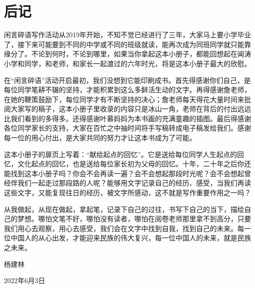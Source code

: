 \chapter{后记}

闲言碎语写作活动从2019年开始，不知不觉已经进行了三年，大家马上要小学毕业了，接下来可能要到不同的中学或不同的班级就读，能再次成为同班同学就只能靠缘分了。不论到何时，不论到哪里，如果当你拿起这本小册子，都能回想起在闻涛小学和同学，和老师，和家长一起渡过的六年时光，将是这本小册子最大的欣慰。

在“闲言碎语”活动开启最初，我们没想到它能印刷成书。首先得感谢你们自己，是每位同学笔耕不辍的坚持，才能积累到这么多鲜活生动的文字。再得感谢詹老师，在她的鞭策鼓励下，每位同学才有不断坚持的决心；詹老师每天得花大量时间来批阅大家写的稿子，这本小册子里收录的内容只是冰山一角，老师在背后的付出远远比我们看到的多得多。还得感谢叶慕妈妈为本书画的充满童趣的插图。最后得感谢各位同学家长的支持，大家在百忙之中抽时间将手写稿转成电子稿发给我们。感谢每一位的用心付出，是大家共同的努力才让这本书成为了可能。

这本小册子的扉页上写着：“献给起点的回忆”。它是送给每位同学人生起点的回忆，文化起点的回忆，也是送给每位家长初为父母的回忆。十年，二十年之后你还能找到这本小册子吗？你会不会再读一遍？会不会想起那段时光呢？会不会想起曾经伴我们一起走过那段路的人呢？能够用文字记录自己的经历、感受，当我们再读这些文字，又能复现往日的经历，被文字所感动，这不就是写作重要作用之一吗？



从我做起，从现在做起，拿起笔，记录下自己的过往，书写下自己的当下，描绘自己的梦想。哪怕文笔不好，哪怕没有读者，哪怕在阅卷老师那里拿不到高分，只要我们用心去观察，用心去感受，我们会在文字中找到自我，找到自己的未来。每一位中国人的从心出发，才能迎来民族的伟大复兴，每一位中国人的未来，就是民族之未来。

\vspace{5em}

杨建林

2022年6月3日
